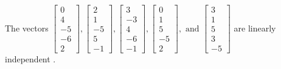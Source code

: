 \begin{exercise}
\begin{exerciseStatement}
  \end{exerciseStatement}
  \begin{exerciseAnswer}
   The vectors \(\left[\begin{array}{r}
0 \\
4 \\
-5 \\
-6 \\
2
\end{array}\right] , \left[\begin{array}{r}
2 \\
1 \\
-5 \\
5 \\
-1
\end{array}\right] , \left[\begin{array}{r}
3 \\
-3 \\
4 \\
-6 \\
-1
\end{array}\right] , \left[\begin{array}{r}
0 \\
1 \\
5 \\
-5 \\
2
\end{array}\right] , \text{ and } \left[\begin{array}{r}
3 \\
1 \\
5 \\
3 \\
-5
\end{array}\right]\) are 
  	 linearly independent  .
  


  \end{exerciseAnswer}
\end{exercise}